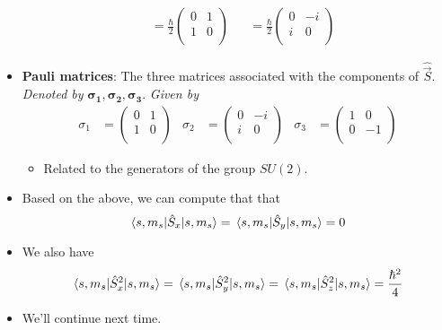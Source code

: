 \documentclass[../notes.tex]{subfiles}
\begin{document}
\begin{itemize}
\begin{align*}
        &= \frac{\hbar}{2}
        \begin{pmatrix}
            0 & 1\\
            1 & 0\\
        \end{pmatrix}&
            &= \frac{\hbar}{2}
            \begin{pmatrix}
                0 & -i\\
                i & 0\\
            \end{pmatrix}
    \end{align*}
    \item \textbf{Pauli matrices}: The three matrices associated with the components of $\hat{\vec{S}}$. \emph{Denoted by} $\bm{\sigma_1},\bm{\sigma_2},\bm{\sigma_3}$. \emph{Given by}
    \begin{align*}
        \sigma_1 &=
        \begin{pmatrix}
            0 & 1\\
            1 & 0\\
        \end{pmatrix}&
        \sigma_2 &=
        \begin{pmatrix}
            0 & -i\\
            i & 0\\
        \end{pmatrix}&
        \sigma_3 &=
        \begin{pmatrix}
            1 & 0\\
            0 & -1\\
        \end{pmatrix}
    \end{align*}
    \begin{itemize}
        \item Related to the generators of the group $SU(2)$.
    \end{itemize}
    \item Based on the above, we can compute that that
    \begin{equation*}
        \ev{\hat{S}_x}{s,m_s} = \ev{\hat{S}_y}{s,m_s} = 0
    \end{equation*}
    \item We also have
    \begin{equation*}
        \ev{\hat{S}_x^2}{s,m_s} = \ev{\hat{S}_y^2}{s,m_s}
        = \ev{\hat{S}_z^2}{s,m_s}
        = \frac{\hbar^2}{4}\\
    \end{equation*}
    \item We'll continue next time.
\end{itemize}
\end{document}
